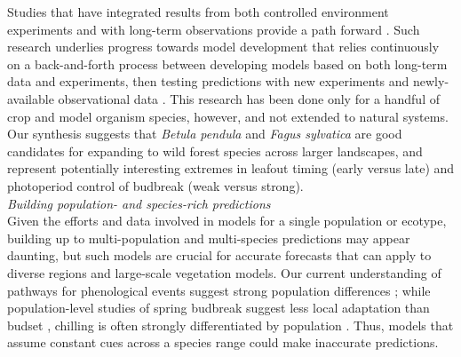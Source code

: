 \documentclass[11pt,letter]{article}
\begin{document}
Studies that have integrated results from both controlled environment experiments and with long-term observations provide a path forward \citep{Caffarra:2011qf,satake2013,chuinearees}. Such research underlies progress towards model development that relies continuously on a back-and-forth process between developing models based on both long-term data and experiments, then testing predictions with new experiments and newly-available observational data \citep{satake2013}. This research has been done only for a handful of crop and model organism species, however, and not extended to natural systems. Our synthesis suggests that \emph{Betula pendula} and \emph{Fagus sylvatica} are good candidates for expanding to wild forest species across larger landscapes, and represent potentially interesting extremes in leafout timing (early versus late) and photoperiod control of budbreak (weak versus strong).\\ %

\emph{Building population- and species-rich predictions} \\
Given the efforts and data involved in models for a single population or ecotype, building up to multi-population and multi-species predictions may appear daunting, but such models are crucial for accurate forecasts that can apply to diverse regions and large-scale vegetation models. Our current understanding of pathways for phenological events suggest strong population differences \citep{Wilczek:2009oa,Tanino2010}; while population-level studies of spring budbreak suggest less local adaptation than budset \citep{Aitken:2008}, chilling is often strongly differentiated by population \citep{Junttila:2012aa}. Thus, models that assume constant cues across a species range could make inaccurate predictions. \\
\end{document}
